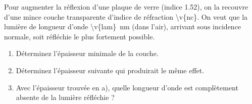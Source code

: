 Pour augmenter la réflexion d'une plaque de verre (indice \num{1.52}), on la recouvre d'une mince couche transparente d'indice de réfraction \num{\v{nc}}. On veut que la lumière de longueur d'onde \qty{\v{lam}}{nm} (dans l'air), arrivant sous incidence normale, soit réfléchie le plus fortement possible.

\begin{enumerate}[label=\alph*)]
    \item Déterminez l'épaisseur minimale de la couche.
    \item Déterminez l'épaisseur suivante qui produirait le même effet.
    \item Avec l'épaisseur trouvée en a), quelle longueur d'onde est complètement absente de la lumière réfléchie ?
\end{enumerate}
